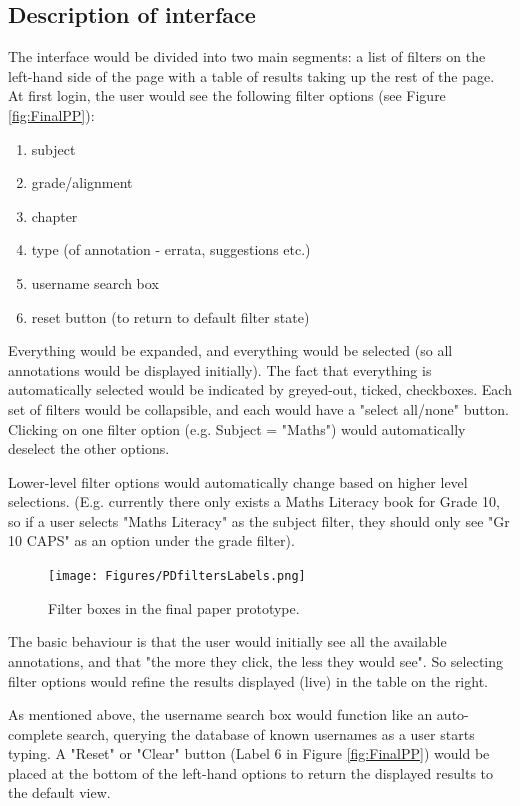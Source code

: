 \subsection{Description of interface}
The interface would be divided into two main segments: a list of filters on the left-hand side of the page with a table of results taking up the rest of the page. At first login, the user would see the following filter options (see Figure \ref{fig:FinalPP}):
\begin{enumerate}
 \item subject
 \item grade/alignment 
 \item chapter
 \item type (of annotation - errata, suggestions etc.)
 \item username search box
 \item reset button (to return to default filter state)
\end{enumerate}

Everything would be expanded, and everything would be selected (so all annotations would be displayed initially). The fact that everything is automatically selected would be indicated by greyed-out, ticked, checkboxes. Each set of filters would be collapsible, and each would have a "select all/none" button. Clicking on one filter option (e.g. Subject = "Maths") would automatically deselect the other options. 

Lower-level filter options would automatically change based on higher level selections. (E.g. currently there only exists a Maths Literacy book for Grade 10, so if a user selects "Maths Literacy" as the subject filter, they should only see "Gr 10 CAPS" as an option under the grade filter). 

\begin{figure}[h!]
    \centering
    \texttt{[image: Figures/PDfiltersLabels.png]}
 \caption{Filter boxes in the final paper prototype.}
 \label{fig:FilterBoxes}
\end{figure}

The basic behaviour is that the user would initially see all the available annotations, and that "the more they click, the less they would see". So selecting filter options would refine the results displayed (live) in the table on the right. 

As mentioned above, the username search box would function like an auto-complete search, querying the database of known usernames as a user starts typing. A "Reset" or "Clear" button (Label 6 in Figure \ref{fig:FinalPP}) would be placed at the bottom of the left-hand options to return the displayed results to the default view. 

